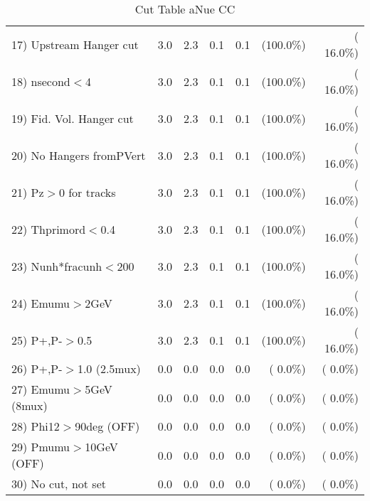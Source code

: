 \begin{table}[h!]
\begin{tabular}{||l||r|r|r|r|r|r||}
 17) Upstream Hanger cut  &          3.0 &          2.3 &          0.1 &          0.1 & (100.0\%) & ( 16.0\%) \\
 18) nsecond$<$4          &          3.0 &          2.3 &          0.1 &          0.1 & (100.0\%) & ( 16.0\%) \\
 19) Fid. Vol. Hanger cut &          3.0 &          2.3 &          0.1 &          0.1 & (100.0\%) & ( 16.0\%) \\
 20) No Hangers fromPVert &          3.0 &          2.3 &          0.1 &          0.1 & (100.0\%) & ( 16.0\%) \\
 21) Pz$>$0 for tracks    &          3.0 &          2.3 &          0.1 &          0.1 & (100.0\%) & ( 16.0\%) \\
 22) Thprimord$<$0.4      &          3.0 &          2.3 &          0.1 &          0.1 & (100.0\%) & ( 16.0\%) \\
 23) Nunh*fracunh$<$200   &          3.0 &          2.3 &          0.1 &          0.1 & (100.0\%) & ( 16.0\%) \\
 24) Emumu$>$2GeV         &          3.0 &          2.3 &          0.1 &          0.1 & (100.0\%) & ( 16.0\%) \\
 25) P+,P-$>$0.5          &          3.0 &          2.3 &          0.1 &          0.1 & (100.0\%) & ( 16.0\%) \\
 26) P+,P-$>$1.0 (2.5mux) &          0.0 &          0.0 &          0.0 &          0.0 & (  0.0\%) & (  0.0\%) \\
 27) Emumu$>$5GeV  (8mux) &          0.0 &          0.0 &          0.0 &          0.0 & (  0.0\%) & (  0.0\%) \\
 28) Phi12$>$90deg  (OFF) &          0.0 &          0.0 &          0.0 &          0.0 & (  0.0\%) & (  0.0\%) \\
 29) Pmumu$>$10GeV  (OFF) &          0.0 &          0.0 &          0.0 &          0.0 & (  0.0\%) & (  0.0\%) \\
 30) No cut, not set      &          0.0 &          0.0 &          0.0 &          0.0 & (  0.0\%) & (  0.0\%) \\
 \hline
 \hline
 \end{tabular}
 \caption{Cut Table  aNue CC  }
 \label{tab-cutheavy_neutrino_3.000}
 \end{table}
